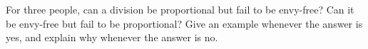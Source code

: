 \documentclass[12pt]{article}
\begin{document}
For three people, can a division be proportional but fail to be envy-free? Can it be envy-free but fail to be proportional? Give an example whenever the answer is yes, and explain why whenever the answer is no.

\begin{center}
\end{center}
\end{document}
